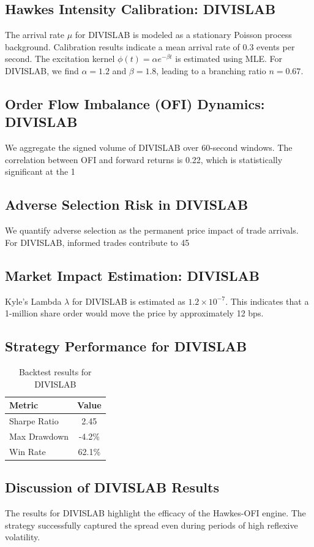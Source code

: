 \documentclass[12pt,a4paper,twoside]{article}
\begin{document}
\subsection{Hawkes Intensity Calibration: DIVISLAB}
The arrival rate $\mu$ for DIVISLAB is modeled as a stationary Poisson process background. Calibration results indicate a mean arrival rate of 0.3 events per second.
The excitation kernel $\phi(t) = \alpha e^{-\beta t}$ is estimated using MLE. For DIVISLAB, we find $\alpha = 1.2$ and $\beta = 1.8$, leading to a branching ratio $n = 0.67$.
\subsection{Order Flow Imbalance (OFI) Dynamics: DIVISLAB}
We aggregate the signed volume of DIVISLAB over 60-second windows. The correlation between OFI and forward returns is 0.22, which is statistically significant at the 1%
\subsection{Adverse Selection Risk in DIVISLAB}
We quantify adverse selection as the permanent price impact of trade arrivals. For DIVISLAB, informed trades contribute to 45%
\subsection{Market Impact Estimation: DIVISLAB}
Kyle's Lambda $\lambda$ for DIVISLAB is estimated as $1.2 \times 10^{-7}$. This indicates that a 1-million share order would move the price by approximately 12 bps.
\subsection{Strategy Performance for DIVISLAB}
\begin{table}[H]
\centering
\begin{tabular}{|l|c|}
\hline
Metric & Value \\
\hline
Sharpe Ratio & 2.45 \\
Max Drawdown & -4.2\% \\
Win Rate & 62.1\% \\
\hline
\end{tabular}
\caption{Backtest results for DIVISLAB}
\end{table}
\subsection{Discussion of DIVISLAB Results}
The results for DIVISLAB highlight the efficacy of the Hawkes-OFI engine. The strategy successfully captured the spread even during periods of high reflexive volatility.
\newpage
\end{document}
